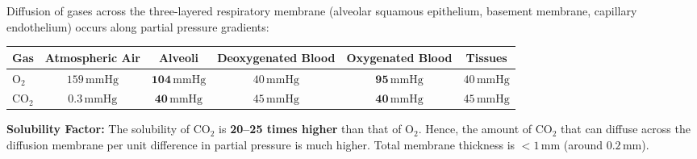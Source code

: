 \documentclass[10pt,a4paper]{article}
\begin{document}
\begin{conceptbox}
Diffusion of gases across the three-layered respiratory membrane (alveolar squamous epithelium, basement membrane, capillary endothelium) occurs along partial pressure gradients:
\begin{center}
\small
\begin{tabular}{|l|c|c|c|c|c|}
\hline
\textbf{Gas} & \textbf{Atmospheric Air} & \textbf{Alveoli} & \textbf{Deoxygenated Blood} & \textbf{Oxygenated Blood} & \textbf{Tissues} \\
\hline
$\mathrm{O_2}$ & $159\,\mathrm{mmHg}$ & $\mathbf{104\,\mathrm{mmHg}}$ & $40\,\mathrm{mmHg}$ & $\mathbf{95\,\mathrm{mmHg}}$ & $40\,\mathrm{mmHg}$ \\
$\mathrm{CO_2}$ & $0.3\,\mathrm{mmHg}$ & $\mathbf{40\,\mathrm{mmHg}}$ & $45\,\mathrm{mmHg}$ & $\mathbf{40\,\mathrm{mmHg}}$ & $45\,\mathrm{mmHg}$ \\
\hline
\end{tabular}
\end{center}
\textbf{Solubility Factor:} The solubility of $\mathrm{CO}_2$ is \textbf{20--25 times higher} than that of $\mathrm{O}_2$. Hence, the amount of $\mathrm{CO}_2$ that can diffuse across the diffusion membrane per unit difference in partial pressure is much higher. Total membrane thickness is $< 1\,\mathrm{mm}$ (around $0.2\,\mathrm{mm}$).
\end{conceptbox}
\end{document}
